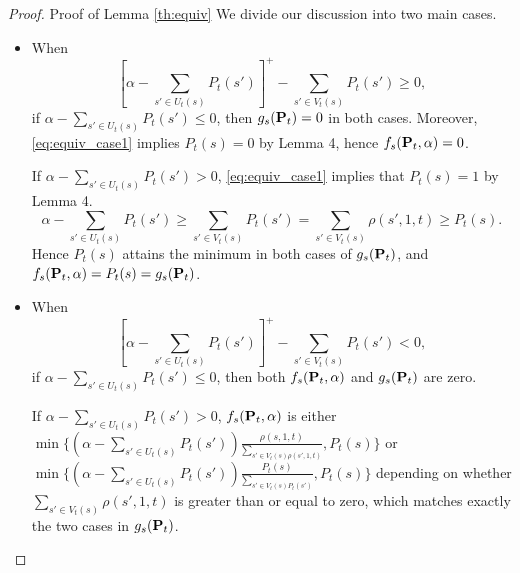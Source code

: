 \section{}\label{ap:equiv}
\begin{proof}{Proof of Lemma \ref{th:equiv}}
We divide our discussion into two main cases.
\begin{itemize}
\item 
When
\begin{equation}\label{eq:equiv_case1}
[\alpha-\sum_{s'\in U_t(s)}P_t(s')]^+ - \sum_{s'\in V_t(s)}P_t(s')\geq 0,
\end{equation} 
if $\alpha-\sum_{s'\in U_t(s)}P_t(s')\leq 0$, then $g_s(\mathbf{P}_t)=0$ in both cases. Moreover, \eqref{eq:equiv_case1} implies $P_t(s)=0$ by Lemma 4, hence $f_s(\mathbf{P}_t,\alpha)=0$.

If $\alpha-\sum_{s'\in U_t(s)}P_t(s')> 0$, \eqref{eq:equiv_case1} implies that $P_t(s)=1$ by Lemma 4.
$$\alpha-\sum_{s'\in U_t(s)}P_t(s')\geq \sum_{s'\in V_t(s)}P_t(s') = \sum_{s'\in V_t(s)}\rho(s',1,t) \geq P_t(s).$$
Hence $P_t(s)$ attains the minimum in both cases of $g_s(\mathbf{P}_t)$, and $f_s(\mathbf{P}_t,\alpha)=P_t(s) = g_s(\mathbf{P}_t)$.
\item When 
\begin{equation}\label{eq:equiv_case2}
[\alpha-\sum_{s'\in U_t(s)}P_t(s')]^+ - \sum_{s'\in V_t(s)}P_t(s') < 0,
\end{equation} 
if $\alpha-\sum_{s'\in U_t(s)}P_t(s')\leq 0$, then both $f_s(\mathbf{P}_t,\alpha)$ and $ g_s(\mathbf{P}_t)$ are zero.

If $\alpha-\sum_{s'\in U_t(s)}P_t(s')>0$, $f_s(\mathbf{P}_t,\alpha)$ is either $\min\{(\alpha-\sum_{s'\in U_t(s)}P_t(s'))\frac{\rho(s,1,t)}{\sum_{s'\in V_t(s)\rho(s',1,t)}},P_t(s)\}$
 or $\min\{(\alpha-\sum_{s'\in U_t(s)}P_t(s'))\frac{P_t(s)}{\sum_{s'\in V_t(s)P_t(s')}},P_t(s)\}$ 
 depending on whether $\sum_{s'\in V_t(s)}\rho(s',1,t)$ is greater than or equal to zero, which matches exactly the two cases in $g_s(\mathbf{P}_t)$.
\end{itemize}
\end{proof}
